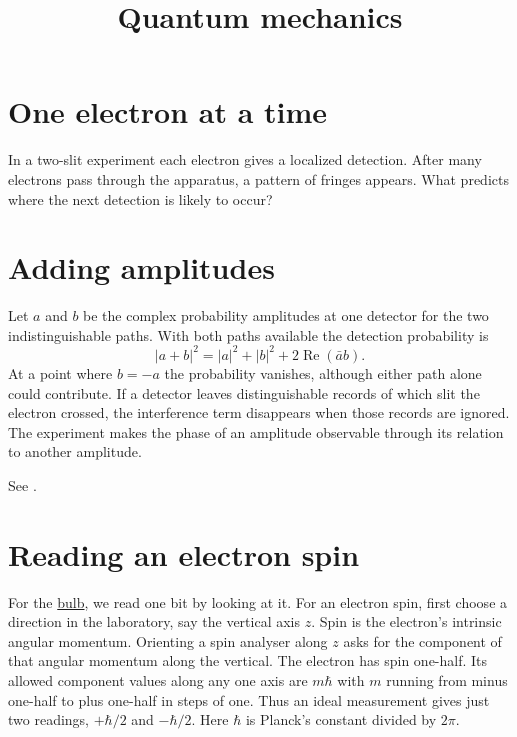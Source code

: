 



\title{
Quantum mechanics}
\maketitle

\tableofcontents

\section{One electron at a time}
In a two-slit experiment each electron gives
a localized detection. After many electrons
pass through the apparatus, a pattern of
fringes appears. What predicts where the next
detection is likely to occur?

\section{Adding amplitudes}
Let $a$ and $b$ be the complex probability
amplitudes at one detector for the two
indistinguishable paths. With both paths
available the detection probability is
$$
|a+b|^2=|a|^2+|b|^2
+2\operatorname{Re}(\bar a b).
$$
At a point where $b=-a$ the probability
vanishes, although either path alone could
contribute. If a detector leaves
distinguishable records of which slit the
electron crossed, the interference term
disappears when those records are ignored.
The experiment makes the phase of an
amplitude observable through its relation to
another amplitude.

See \cite[Vol. III, Sections 1-4 to
1-7]{feynman-lectures}.

\section{Reading an electron spin}
\label{section-reading-spin}

For the
\href{https://www.heap-project.org/tag/0HHK}
{bulb}, we read one bit by looking at it.
For an electron spin, first choose a
direction in the laboratory, say the vertical
axis $z$. Spin is the electron's intrinsic
angular momentum. Orienting a spin analyser
along $z$ asks for the component of that
angular momentum along the vertical. The
electron has spin one-half. Its allowed
component values along any one axis are
$m\hbar$ with $m$ running from minus one-half
to plus one-half in steps of one. Thus an
ideal measurement gives just two readings,
$+\hbar/2$ and $-\hbar/2$. Here $\hbar$ is
Planck's constant divided by $2\pi$.

